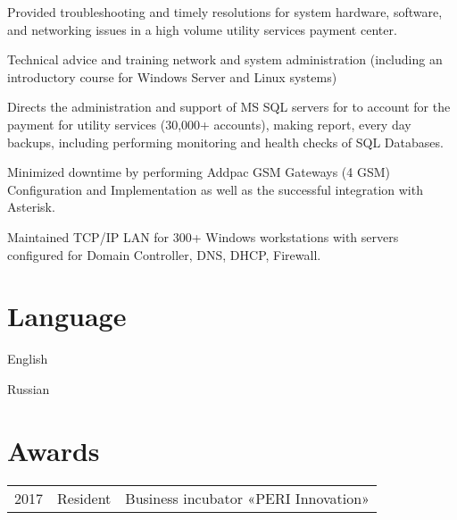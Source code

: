 \documentclass[]{deedy-resume-openfont}
\begin{document}
\begin{minipage}[t]{0.66\textwidth}
Provided troubleshooting and timely resolutions for system hardware, software, and networking issues in a high volume utility services payment center.
\begin{tightemize}
\item Technical advice and training network and system administration (including an introductory course for Windows Server and Linux systems) 
\item Directs the administration and support of MS SQL servers for to account for the payment for utility services (30,000+ accounts), making report, every day backups, including performing monitoring and health checks of SQL Databases.
\item Minimized downtime by performing Addpac GSM Gateways (4 GSM) Configuration and Implementation as well as the successful integration with Asterisk.
\item Maintained TCP/IP LAN for 300+ Windows workstations with servers configured for Domain Controller, DNS, DHCP, Firewall.
\end{tightemize}
\sectionsep


\section{Language}
\vspace{\topsep}
\begin{tightemize}
\item English
\item Russian
\end{tightemize}
\sectionsep


\section{Awards} 
\begin{tabular}{rll}
2017	     & Resident  & Business incubator «PERI Innovation»
\\

\end{tabular}
\sectionsep

\end{minipage} 
\end{document}
